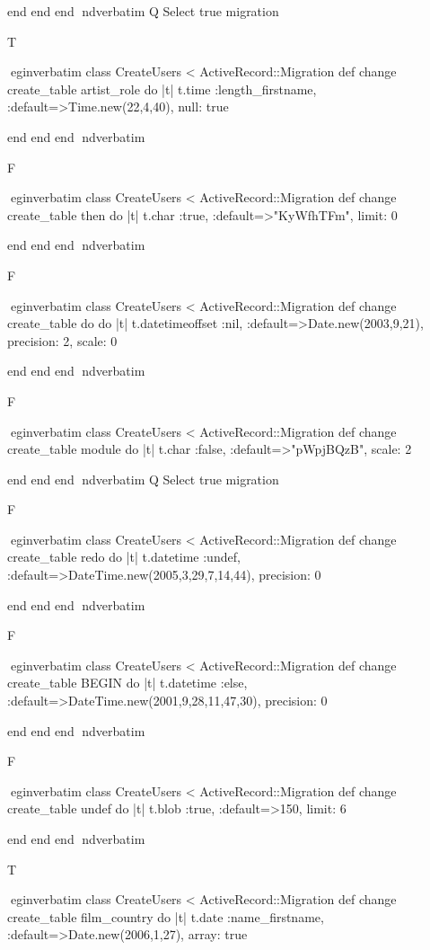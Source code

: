     end 
  end 
end
nd{verbatim}
Q
 Select true migration

T

egin{verbatim}
 class CreateUsers < ActiveRecord::Migration 
  def change 
    create_table artist_role do |t| 
      t.time :length_firstname, :default=>Time.new(22,4,40), null: true
    
    end 
  end 
end
nd{verbatim}

F

egin{verbatim}
 class CreateUsers < ActiveRecord::Migration 
  def change 
    create_table then do |t| 
      t.char :true, :default=>"KyWfhTFm", limit: 0
    
    end 
  end 
end
nd{verbatim}

F

egin{verbatim}
 class CreateUsers < ActiveRecord::Migration 
  def change 
    create_table do do |t| 
      t.datetimeoffset :nil, :default=>Date.new(2003,9,21), precision: 2, scale: 0
    
    end 
  end 
end
nd{verbatim}

F

egin{verbatim}
 class CreateUsers < ActiveRecord::Migration 
  def change 
    create_table module do |t| 
      t.char :false, :default=>"pWpjBQzB", scale: 2
    
    end 
  end 
end
nd{verbatim}
Q
 Select true migration

F

egin{verbatim}
 class CreateUsers < ActiveRecord::Migration 
  def change 
    create_table redo do |t| 
      t.datetime :undef, :default=>DateTime.new(2005,3,29,7,14,44), precision: 0
    
    end 
  end 
end
nd{verbatim}

F

egin{verbatim}
 class CreateUsers < ActiveRecord::Migration 
  def change 
    create_table BEGIN do |t| 
      t.datetime :else, :default=>DateTime.new(2001,9,28,11,47,30), precision: 0
    
    end 
  end 
end
nd{verbatim}

F

egin{verbatim}
 class CreateUsers < ActiveRecord::Migration 
  def change 
    create_table undef do |t| 
      t.blob :true, :default=>150, limit: 6
    
    end 
  end 
end
nd{verbatim}

T

egin{verbatim}
 class CreateUsers < ActiveRecord::Migration 
  def change 
    create_table film_country do |t| 
      t.date :name_firstname, :default=>Date.new(2006,1,27), array: true
    
